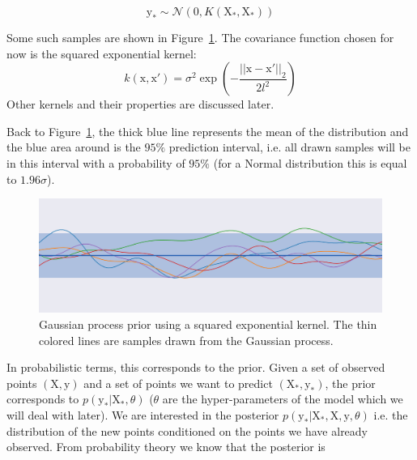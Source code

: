 \begin{equation}
    \mathrm{y_*} \sim \mathcal{N} \left( 0, K(\mathrm{X_*}, \mathrm{X_*})\right)
\end{equation}

Some such samples are shown in Figure~\ref{fig:gp_prior}. The covariance function chosen for now is the squared exponential kernel:
\begin{equation}
	k(\mathrm{x}, \mathrm{x'}) = \sigma^2 \exp\left( -\frac{||\mathrm{x} - \mathrm{x'}||_2}{2l^2}\right)
\end{equation}
Other kernels and their properties are discussed later. 

Back to Figure~\ref{fig:gp_prior}, the thick blue line represents the mean of the distribution and the blue area around is the $95 \%$ prediction interval, i.e. all drawn samples will be in this interval with a probability of $95 \%$ (for a Normal distribution this is equal to $1.96 \sigma$). 


\begin{figure}[htb]
	\centering
	\includegraphics[width=\linewidth]{img_hyperopt/gp_prior.png}
	\caption{Gaussian process prior using a squared exponential kernel. The thin colored lines are samples drawn from the Gaussian process.}
	\label{fig:gp_prior}
\end{figure}

In probabilistic terms, this corresponds to the prior. Given a set of observed points $(\mathrm{X}, \mathrm{y})$ and a set of points we want to predict $(\mathrm{X_*}, \mathrm{y_*})$, the prior corresponds to $p\left( \mathrm{y_*} | \mathrm{X_*}, \theta \right)$ ($\theta$ are the hyper-parameters of the model which we will deal with later). We are interested in the posterior $p\left( \mathrm{y_*} | \mathrm{X_*}, \mathrm{X}, \mathrm{y}, \theta \right)$ i.e. the distribution of the new points conditioned on the points we have already observed. From probability theory we know that the posterior is

